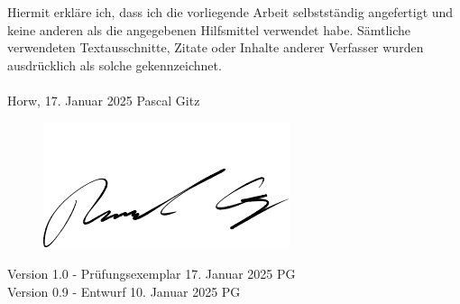 
Hiermit erkläre ich, dass ich die vorliegende Arbeit selbstständig angefertigt und keine anderen als die angegebenen Hilfsmittel verwendet habe. Sämtliche verwendeten Textausschnitte, Zitate oder Inhalte anderer Verfasser wurden ausdrücklich als solche gekennzeichnet.\\%
%
\\%
%
Horw, 17. Januar 2025 \hfill Pascal Gitz
\hfill 
\begin{figure}[H]
    \includegraphics[right]{../imgs/unterschrift}
\end{figure}

\vfill

Version 1.0 - Prüfungsexemplar \hfill 17. Januar 2025 \quad \quad \quad \quad \quad PG\\
Version 0.9 - Entwurf \hfill 10. Januar 2025 \quad \quad \quad \quad \quad PG\\

\newpage